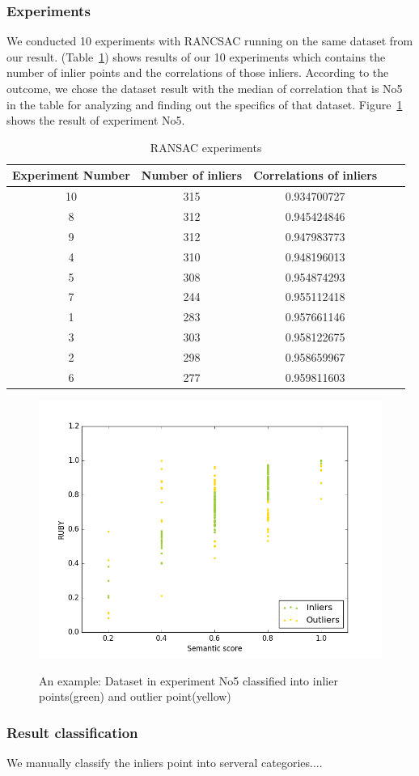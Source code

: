 \subsubsection{Experiments}
We conducted 10 experiments with RANCSAC running on the same dataset from our result.  (Table~\ref{table:RANSAC_experiments}) shows results of our 10 experiments which contains the number of inlier points and the correlations of those inliers. According to the outcome, we chose the dataset result with the median of correlation that is No5 in the table for analyzing and finding out the specifics of that dataset. Figure~\ref{fig:inliers_outliers} shows the result of experiment No5.
\begin{table}
	\caption{RANSAC experiments}
	\begin{tabular}{|c|c|c|c|c|}
		\hline
		Experiment Number & Number of inliers & Correlations of inliers \\
		\hline
		10	& 315	& 0.934700727 \\		
		8	& 312	& 0.945424846 \\	
		9	& 312	& 0.947983773 \\
		4	& 310	& 0.948196013 \\
		{\cellcolor[gray]{.8}}5	& {\cellcolor[gray]{.8}}308	& {\cellcolor[gray]{.8}}0.954874293 \\
		7	& 244	& 0.955112418 \\	
		1	& 283	& 0.957661146 \\
		3	& 303	& 0.958122675 \\
		2	& 298	& 0.958659967 \\
		6	& 277	& 0.959811603 \\		
		\hline
	\end{tabular}
	\label{table:RANSAC_experiments}
\end{table}

\begin{figure}[t]
	\caption{An example: Dataset in experiment No5 classified into inlier points(green) and outlier point(yellow)}
	\includegraphics[scale=0.4]{img/inliers_outliers.png}
	\centering
	\label{fig:inliers_outliers}
\end{figure}

\subsubsection{Result classification}
We manually classify the inliers point into serveral categories....
